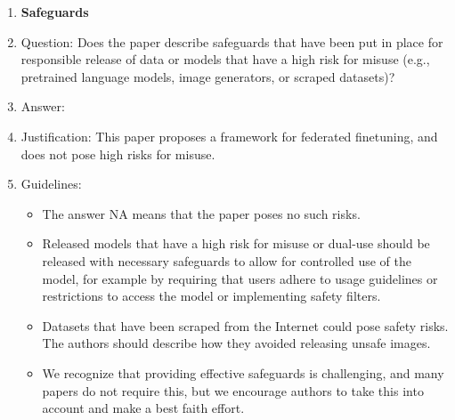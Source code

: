 \documentclass{article}
\theoremstyle{plain}
\theoremstyle{definition}
\theoremstyle{remark}
\begin{document}
\begin{enumerate}
\item {\bf Safeguards}
    \item[] Question: Does the paper describe safeguards that have been put in place for responsible release of data or models that have a high risk for misuse (e.g., pretrained language models, image generators, or scraped datasets)?
    \item[] Answer: \answerNA{} %
    \item[] Justification: This paper proposes a framework for federated finetuning, and does not pose high risks for misuse.
    \item[] Guidelines:
    \begin{itemize}
        \item The answer NA means that the paper poses no such risks.
        \item Released models that have a high risk for misuse or dual-use should be released with necessary safeguards to allow for controlled use of the model, for example by requiring that users adhere to usage guidelines or restrictions to access the model or implementing safety filters. 
        \item Datasets that have been scraped from the Internet could pose safety risks. The authors should describe how they avoided releasing unsafe images.
        \item We recognize that providing effective safeguards is challenging, and many papers do not require this, but we encourage authors to take this into account and make a best faith effort.
    \end{itemize}


\end{enumerate}
\end{document}
